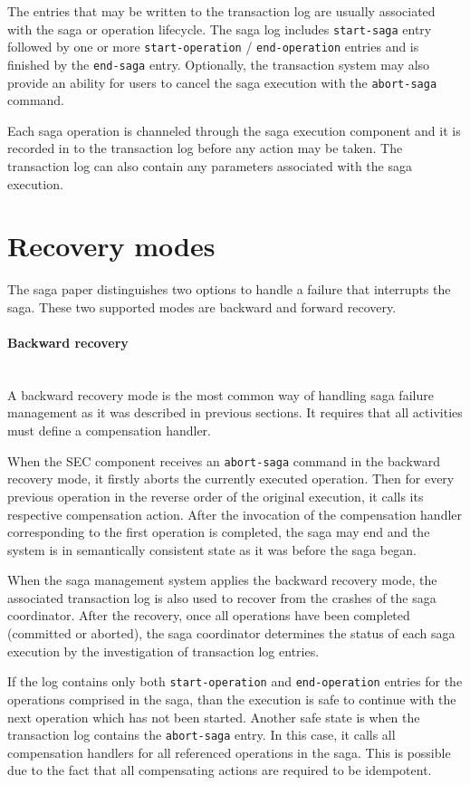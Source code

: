 \documentclass[oneside,
  digital, %
  table,   %
  lof,     %
  lot,     %
]{fithesis3}
\newcommand{\newlinepar}[1]{\paragraph{#1}\needspace{4\baselineskip}\mbox{}\\}
\begin{document}
The entries that may be written to the transaction log are usually associated with the saga or operation lifecycle. The saga log includes \texttt{start-saga} entry followed by one or more \texttt{start-operation} / \texttt{end-operation} entries and is finished by the \texttt{end-saga} entry. Optionally, the transaction system may also provide an ability for users to cancel the saga execution with the \texttt{abort-saga} command. 

Each saga operation is channeled through the saga execution component and it is recorded in to the transaction log before any action may be taken. The transaction log can also contain any parameters associated with the saga execution.

\section{Recovery modes}
\label{sec:recovery-modes}

The saga paper \cite{sagas_publ} distinguishes two options to handle a failure that interrupts the saga. These two supported modes are backward and forward recovery.

\newlinepar{Backward recovery}

A backward recovery mode is the most common way of handling saga failure management as it was described in previous sections. It requires that all activities must define a compensation handler.

When the SEC component receives an \texttt{abort-saga} command in the backward recovery mode, it firstly aborts the currently executed operation. Then for every previous operation in the reverse order of the original execution, it calls its respective compensation action. After the invocation of the compensation handler corresponding to the first operation is completed, the saga may end and the system is in semantically consistent state as it was before the saga began.

When the saga management system applies the backward recovery mode, the associated transaction log is also used to recover from the crashes of the saga coordinator. After the recovery, once all operations have been completed (committed or aborted), the saga coordinator determines the status of each saga execution by the investigation of transaction log entries. 

If the log contains only both \texttt{start-operation} and \texttt{end-operation} entries for the operations comprised in the saga,  than the execution is safe to continue with the next operation which has not been started. Another safe state is when the transaction log contains the \texttt{abort-saga} entry. In this case, it calls all compensation handlers for all referenced operations in the saga. This is possible due to the fact that all compensating actions are required to be idempotent.
\end{document}
